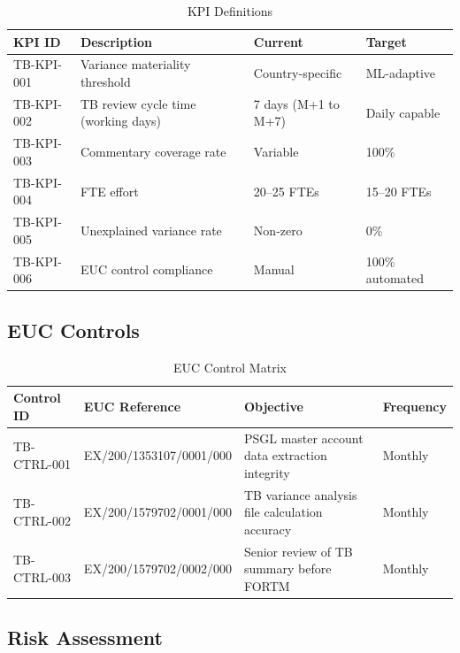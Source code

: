 \documentclass[11pt,a4paper]{article}
\begin{document}
\begin{table}[H]
\centering
\caption{KPI Definitions}
\begin{tabularx}{\textwidth}{lXll}
\toprule
\textbf{KPI ID} & \textbf{Description} & \textbf{Current} & \textbf{Target} \\
\midrule
TB-KPI-001 & Variance materiality threshold & Country-specific & ML-adaptive \\
TB-KPI-002 & TB review cycle time (working days) & 7 days (M+1 to M+7) & Daily capable \\
TB-KPI-003 & Commentary coverage rate & Variable & 100\% \\
TB-KPI-004 & FTE effort & 20--25 FTEs & 15--20 FTEs \\
TB-KPI-005 & Unexplained variance rate & Non-zero & 0\% \\
TB-KPI-006 & EUC control compliance & Manual & 100\% automated \\
\bottomrule
\end{tabularx}
\end{table}

\subsection{EUC Controls}

\begin{table}[H]
\centering
\caption{EUC Control Matrix}
\begin{tabularx}{\textwidth}{llXl}
\toprule
\textbf{Control ID} & \textbf{EUC Reference} & \textbf{Objective} & \textbf{Frequency} \\
\midrule
TB-CTRL-001 & EX/200/1353107/0001/000 & PSGL master account data extraction integrity & Monthly \\
TB-CTRL-002 & EX/200/1579702/0001/000 & TB variance analysis file calculation accuracy & Monthly \\
TB-CTRL-003 & EX/200/1579702/0002/000 & Senior review of TB summary before FORTM & Monthly \\
\bottomrule
\end{tabularx}
\end{table}

\subsection{Risk Assessment}
\end{document}
